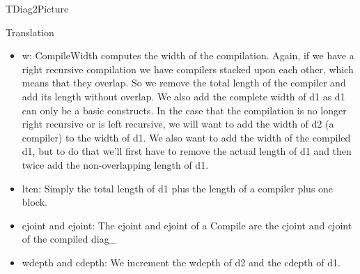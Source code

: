 \documentclass{article}
\begin{document}
\begin{subsection}{TDiag2Picture}
\begin{subsubsection}{Translation}
\begin{itemize}
	\item w: CompileWidth computes the width of the compilation. Again, if we have a right recursive compilation we have compilers stacked upon each other, which means that they overlap. So we remove the total length of the compiler and add its length without overlap. We also add the complete width of d1 as d1 can only be a basic constructs. In the case that the compilation is no longer right recursive or is left recursive, we will want to add the width of d2 (a compiler) to the width of d1. We also want to add the width of the compiled d1, but to do that we'll first have to remove the actual length of d1 and then twice add the non-overlapping length of d1.
	\item lten: Simply the total length of d1 plus the length of a compiler plus one block.
	\item cjoint and ejoint: The cjoint and ejoint of a Compile are the cjoint and cjoint of the compiled diag\_
	\item wdepth and cdepth: We increment the wdepth of d2 and the cdepth of d1.
	\end{itemize}

\end{subsubsection}
\end{subsection}
\end{document}
